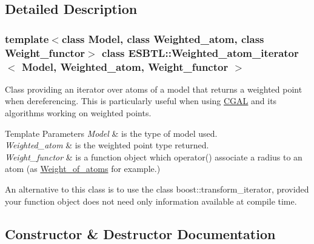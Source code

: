 \subsection{Detailed Description}
\subsubsection*{template$<$class Model, class Weighted\+\_\+atom, class Weight\+\_\+functor$>$\newline
class E\+S\+B\+T\+L\+::\+Weighted\+\_\+atom\+\_\+iterator$<$ Model, Weighted\+\_\+atom, Weight\+\_\+functor $>$}

Class providing an iterator over atoms of a model that returns a weighted point when dereferencing. This is particularly useful when using \hyperlink{namespaceESBTL_1_1CGAL}{C\+G\+AL} and its algorithms working on weighted points. 
\begin{DoxyTemplParams}{Template Parameters}
{\em Model} & is the type of model used. \\
\hline
{\em Weighted\+\_\+atom} & is the weighted point type returned. \\
\hline
{\em Weight\+\_\+functor} & is a function object which operator() associate a radius to an atom (as \hyperlink{structESBTL_1_1Weight__of__atoms}{Weight\+\_\+of\+\_\+atoms} for example.)\\
\hline
\end{DoxyTemplParams}
An alternative to this class is to use the class boost\+::transform\+\_\+iterator, provided your function object does not need only information available at compile time. 

\subsection{Constructor \& Destructor Documentation}
\mbox{\label{classESBTL_1_1Weighted__atom__iterator_a41781a4ac59637e0d6577fe7b929fb99}} 
